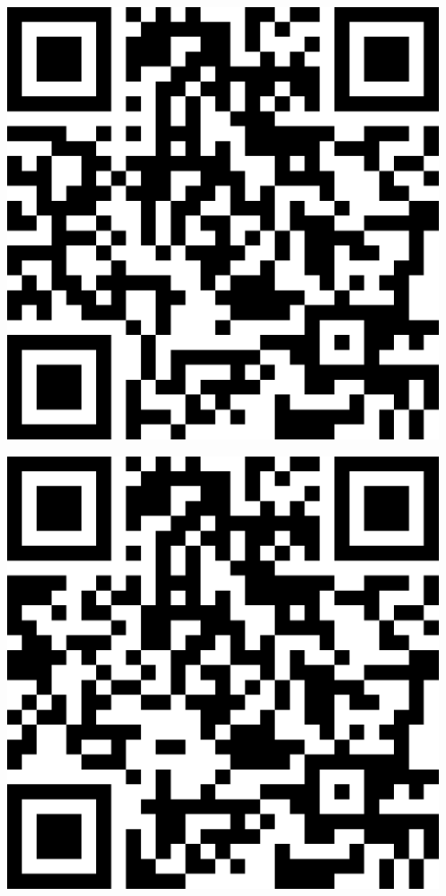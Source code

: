 \documentclass[letterpaper]{article}
\begin{document}
 \endgroup 
 \vspace*{\fill} 
 \pagebreak 
{} 
 \vspace*{\fill} 
 \begingroup 
 \centerline{\includegraphics[scale=1,width=5in,height=5in]{Office3525.png}} 
 \endgroup 
 \vspace*{\fill} 
 \pagebreak 
{} 
 \vspace*{\fill} 
 \begingroup 
 \centerline{\includegraphics[scale=1,width=5in,height=5in]{Office3527.png}} 
\end{document}
